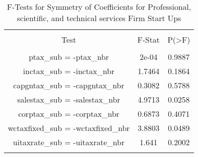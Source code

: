 
\begin{table}[!htbp] \centering 
  \caption{F-Tests for Symmetry of Coefficients for Professional, scientific, and technical services Firm Start Ups} 
  \label{54Ftests} 
\begin{tabular}{@{\extracolsep{5pt}} ccc} 
\\[-1.8ex]\hline 
\hline \\[-1.8ex] 
Test & F-Stat & P(\textgreater F) \\ 
\hline \\[-1.8ex] 
ptax\_sub = -ptax\_nbr & 2e-04 & 0.9887 \\ 
inctax\_sub = -inctax\_nbr & 1.7464 & 0.1864 \\ 
capgntax\_sub = -capgntax\_nbr & 0.3082 & 0.5788 \\ 
salestax\_sub = -salestax\_nbr & 4.9713 & 0.0258 \\ 
corptax\_sub = -corptax\_nbr & 0.6873 & 0.4071 \\ 
wctaxfixed\_sub = -wctaxfixed\_nbr & 3.8803 & 0.0489 \\ 
uitaxrate\_sub = -uitaxrate\_nbr & 1.641 & 0.2002 \\ 
\hline \\[-1.8ex] 
\end{tabular} 
\end{table} 
